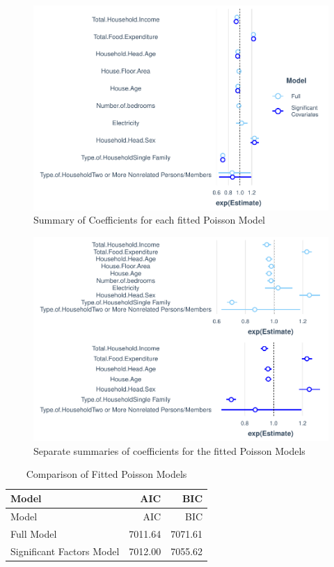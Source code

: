 \documentclass[
]{article}
\begin{document}
\begin{figure}[H]

{\centering \includegraphics[width=0.8\linewidth]{Group_01_Project2_demo_files/figure-latex/summary plot-1} 

}

\caption{Summary of Coefficients for each fitted Poisson Model}\label{fig:summary plot}
\end{figure}

\begin{figure}[H]

{\centering \includegraphics[width=0.8\linewidth]{Group_01_Project2_demo_files/figure-latex/separate summary plots-1} 

}

\caption{Separate summaries of coefficients for the fitted Poisson Models}\label{fig:separate summary plots}
\end{figure}

\begin{longtable}[]{@{}lrr@{}}
\caption{Comparison of Fitted Poisson Models}\tabularnewline
\toprule
Model & AIC & BIC\tabularnewline
\midrule
\endfirsthead
\toprule
Model & AIC & BIC\tabularnewline
\midrule
\endhead
Full Model & 7011.64 & 7071.61\tabularnewline
Significant Factors Model & 7012.00 & 7055.62\tabularnewline
\bottomrule
\end{longtable}
\end{document}
